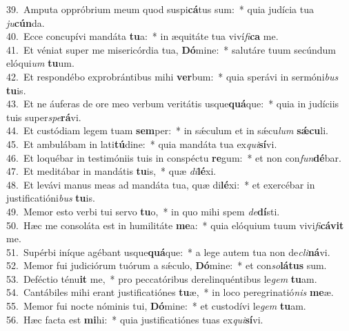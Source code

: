 {39.~}Amputa oppróbrium meum quod suspi\textbf{cá}tus sum:~* quia judícia tua \textit{ju}\textbf{cún}da.\\
{40.~}Ecce concupívi mandáta \textbf{tu}a:~* in æquitáte tua viví\textit{fi}\textbf{ca} me.\\
{41.~}Et véniat super me misericórdia tua, \textbf{Dó}mine:~* salutáre tuum secúndum elóqui\textit{um} \textbf{tu}um.\\
{42.~}Et respondébo exprobrántibus mihi \textbf{ver}bum:~* quia sperávi in sermóni\textit{bus} \textbf{tu}is.\\
{43.~}Et ne áuferas de ore meo verbum veritátis usque\textbf{quá}que:~* quia in judíciis tuis super\textit{spe}\textbf{rá}vi.\\
{44.~}Et custódiam legem tuam \textbf{sem}per:~* in sǽculum et in sǽcu\textit{lum} \textbf{sǽ}\textbf{cu}li.\\
{45.~}Et ambulábam in lati\textbf{tú}dine:~* quia mandáta tua ex\textit{qui}\textbf{sí}vi.\\
{46.~}Et loquébar in testimóniis tuis in conspéctu \textbf{re}gum:~* et non con\textit{fun}\textbf{dé}bar.\\
{47.~}Et meditábar in mandátis \textbf{tu}is,~* quæ \textit{di}\textbf{lé}xi.\\
{48.~}Et levávi manus meas ad mandáta tua, quæ di\textbf{lé}xi:~* et exercébar in justificatióni\textit{bus} \textbf{tu}is.\\
{49.~}Memor esto verbi tui servo \textbf{tu}o,~* in quo mihi spem \textit{de}\textbf{dí}sti.\\
{50.~}Hæc me consoláta est in humilitáte \textbf{me}a:~* quia elóquium tuum vivi\textit{fi}\textbf{cá}\textbf{vit} me.\\
{51.~}Supérbi iníque agébant usque\textbf{quá}que:~* a lege autem tua non de\textit{cli}\textbf{ná}vi.\\
{52.~}Memor fui judiciórum tuórum a sǽculo, \textbf{Dó}mine:~* et con\textit{so}\textbf{lá}\textbf{tus} sum.\\
{53.~}Deféctio ténu\textbf{it} me,~* pro peccatóribus derelinquéntibus le\textit{gem} \textbf{tu}am.\\
{54.~}Cantábiles mihi erant justificatiónes \textbf{tu}æ,~* in loco peregrinatió\textit{nis} \textbf{me}æ.\\
{55.~}Memor fui nocte nóminis tui, \textbf{Dó}mine:~* et custodívi le\textit{gem} \textbf{tu}am.\\
{56.~}Hæc facta est \textbf{mi}hi:~* quia justificatiónes tuas ex\textit{qui}\textbf{sí}vi.\\
